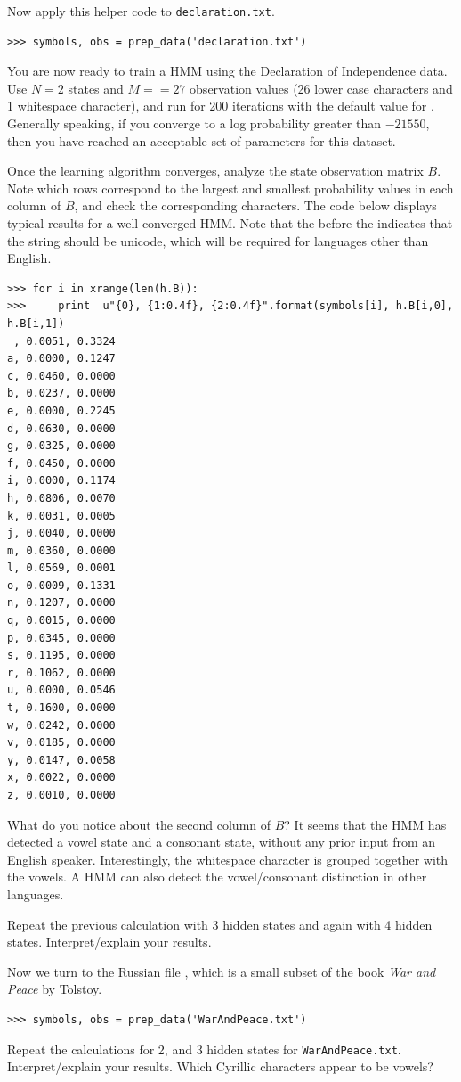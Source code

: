 Now apply this helper code to \texttt{declaration.txt}.
\begin{lstlisting}
>>> symbols, obs = prep_data('declaration.txt')
\end{lstlisting} 

\begin{problem}
You are now ready to train a HMM using the Declaration of Independence data.
Use $N=2$ states and $M=$$=27$ observation values (26 lower case characters and 1 whitespace character),
and run for 200 iterations with the default value for .
Generally speaking, if you converge to a log probability greater than $-21550$, then you have reached
an acceptable set of parameters for this dataset.

Once the learning algorithm converges, analyze the state observation matrix $B$.
Note which rows correspond to the largest and smallest probability values in each column of $B$,
and check the corresponding characters.
The code below displays typical results for a well-converged HMM.  Note that the  before the  indicates that the string should be unicode, which will be required for languages other than English.
\begin{lstlisting}
>>> for i in xrange(len(h.B)):
>>>     print  u"{0}, {1:0.4f}, {2:0.4f}".format(symbols[i], h.B[i,0], h.B[i,1])
 , 0.0051, 0.3324
a, 0.0000, 0.1247
c, 0.0460, 0.0000
b, 0.0237, 0.0000
e, 0.0000, 0.2245
d, 0.0630, 0.0000
g, 0.0325, 0.0000
f, 0.0450, 0.0000
i, 0.0000, 0.1174
h, 0.0806, 0.0070
k, 0.0031, 0.0005
j, 0.0040, 0.0000
m, 0.0360, 0.0000
l, 0.0569, 0.0001
o, 0.0009, 0.1331
n, 0.1207, 0.0000
q, 0.0015, 0.0000
p, 0.0345, 0.0000
s, 0.1195, 0.0000
r, 0.1062, 0.0000
u, 0.0000, 0.0546
t, 0.1600, 0.0000
w, 0.0242, 0.0000
v, 0.0185, 0.0000
y, 0.0147, 0.0058
x, 0.0022, 0.0000
z, 0.0010, 0.0000
\end{lstlisting}
What do you notice about the second column of $B$? It seems that the HMM has detected a vowel state and a consonant state, without any prior input from an English speaker.
Interestingly, the whitespace character is grouped together with the vowels. A HMM can also detect the vowel/consonant distinction in other languages. 
\end{problem}

\begin{problem}
Repeat the previous calculation with 3 hidden states and again with 4 hidden states.  Interpret/explain your results.
\end{problem}


Now we turn to the Russian file , which is a small subset of the book \emph{War and Peace} by Tolstoy. 
\begin{lstlisting}
>>> symbols, obs = prep_data('WarAndPeace.txt')
\end{lstlisting}

\begin{problem}
Repeat the calculations for 2, and 3 hidden states for \texttt{WarAndPeace.txt}.
Interpret/explain your results.  Which Cyrillic characters appear to be vowels? 
\end{problem}


